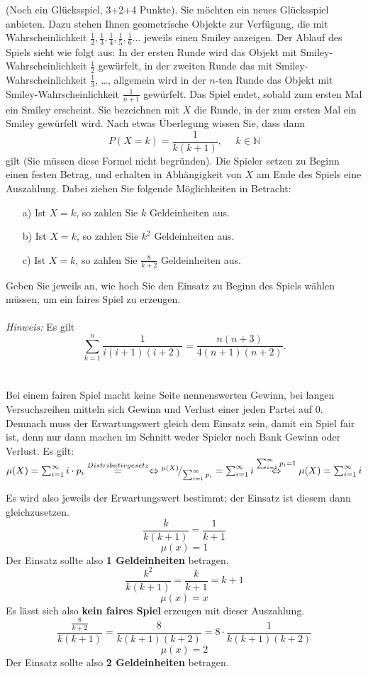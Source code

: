 \documentclass[twoside]{article}
\begin{document}
(Noch ein Glücksspiel, 3+2+4 Punkte).
Sie möchten ein neues Glücksspiel anbieten.
Dazu stehen Ihnen geometrische Objekte zur Verfügung, die mit Wahrscheinlichkeit $\frac{1}{2},\frac{1}{3},\frac{1}{4},\frac{1}{5},\frac{1}{6}\dots$ jeweils einen Smiley anzeigen.
Der Ablauf des Spiels sieht wie folgt aus: In der ersten Runde wird das Objekt mit Smiley-Wahrscheinlichkeit $\frac{1}{2}$ gewürfelt, in der zweiten Runde das mit Smiley-Wahrscheinlichkeit $\frac{1}{3}$, \dots, allgemein wird in der $n$-ten Runde das Objekt mit Smiley-Wahrscheinlichkeit $\frac{1}{n+1}$ gewürfelt.
Das Spiel endet, sobald zum ersten Mal ein Smiley erscheint.
Sie bezeichnen mit $X$ die Runde, in der zum ersten Mal ein Smiley gewürfelt wird.
Nach etwas Überlegung wissen Sie, dass dann
\[
	P(X=k)=\frac{1}{k(k+1)},~~~~~~k \in \mathbb{N}
\]
gilt (Sie müssen diese Formel nicht begründen).
Die Spieler setzen zu Beginn einen festen Betrag, und erhalten in Abhängigkeit von $X$ am Ende des Spiels eine Auszahlung.
Dabei ziehen Sie folgende Möglichkeiten in Betracht:
\begin{enumerate}
	\item[a)] Ist $X=k$, so zahlen Sie $k$ Geldeinheiten aus.
	\item[b)] Ist $X=k$, so zahlen Sie $k^2$ Geldeinheiten aus.
	\item[c)] Ist $X=k$, so zahlen Sie $\frac{8}{k+2}$ Geldeinheiten aus.
\end{enumerate} 
Geben Sie jeweils an, wie hoch Sie den Einsatz zu Beginn des Spiels wählen müssen, um ein faires Spiel zu erzeugen.\\
\vspace{.2cm}\\
\textit{Hinweis:} Es gilt
\[
	\sum_{k=1}^{n}\frac{1}{i(i+1)(i+2)}=\frac{n(n+3)}{4(n+1)(n+2)}.
\]
\-\\\vspace{.3cm}\\
Bei einem fairen Spiel macht keine Seite nennenswerten Gewinn, bei langen Versuchsreihen mitteln sich Gewinn und Verlust einer jeden Partei auf 0.
Demnach muss der Erwartungswert gleich dem Einsatz sein, damit ein Spiel fair ist, denn nur dann machen im Schnitt weder Spieler noch Bank Gewinn oder Verlust.
Es gilt: $\mu(X) = \sum_{i= 1}^{\infty}i\cdot p_i \overset{Distributivgesetz}{=}\Leftrightarrow {}^{\mu(X)}\!/_{\sum_{i= 1}^{\infty}p_i} = \sum_{i= 1}^{\infty}i \overset{\sum_{i= 1}^{\infty}p_i=1}{\Leftrightarrow} \mu(X) = \sum_{i= 1}^{\infty}i$

Es wird also jeweils der Erwartungswert bestimmt; der Einsatz ist diesem dann gleichzusetzen.
\sss
\[
	\frac{k}{k(k+1)}=\frac{1}{k+1}
\]
\[
	\mu(x)=1
\]
Der Einsatz sollte also \textbf{1 Geldeinheiten} betragen.
\sss
\[
	\frac{k^2}{k(k+1)}=\frac{k}{k+1}=k+1
\]
\[
	\mu(x)=x
\]
Es lässt sich also \textbf{kein faires Spiel} erzeugen mit dieser Auszahlung.
\sss
\[
	\frac{\frac{8}{k+2}}{k(k+1)}=\frac{8}{k(k+1)(k+2)}=8\cdot\frac{1}{k(k+1)(k+2)}
\]
\[
	\mu(x)=2
\]
Der Einsatz sollte also \textbf{2 Geldeinheiten} betragen.
\fi
\end{document}
